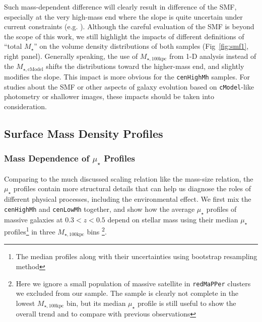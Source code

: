 \documentclass[a4paper,fleqn,usenatbib]{mnras}
\def\redm{\texttt{redMaPPer}}
\def\cmodel{\texttt{cModel}}
\def\rbcg{\texttt{cenHighMh}}
\def\nbcg{\texttt{cenLowMh}}
\def\mstar{{$M_{\star}$}}
\def\mtot{{$M_{\star,100\mathrm{kpc}}$}}
\def\mcmodel{{$M_{\star,\mathrm{cModel}}$}}
\def\mden{{$\mu_{\star}$}}
\begin{document}
    Such mass-dependent difference will clearly result in difference of the SMF, 
    especially at the very high-mass end where the slope is quite uncertain under
    current constraints (e.g. \citealt{Bernardi2016}).
    Although the careful evaluation of the SMF is beyond the scope of this work, 
    we still highlight the impacts of different definitions of ``total \mstar{}''
    on the volume density distributions of both samples (Fig~\ref{fig:smf1}, 
    right panel).  
    Generally speaking, the use of \mtot{} from 1-D analysis instead of the
    \mcmodel{} shifts the distributions toward the higher-mass end, and slightly 
    modifies the slope.
    This impact is more obvious for the \rbcg{} samples.
    For studies about the SMF or other aspects of galaxy evolution based on 
    \cmodel{}-like photometry or shallower images, these impacts should be 
    taken into consideration.


\subsection{Surface Mass Density Profiles}
    \label{ssec:sbp_compare}

\subsubsection{Mass Dependence of \mden{} Profiles}
    \label{sssec:sbp_inter}
          
    Comparing to the much discussed scaling relation like the mass-size relation, 
    the \mden{} profiles contain more structural details that can help us diagnose the 
    roles of different physical processes, including the environmental effect.  
    We first mix the \rbcg{} and \nbcg{} together, and show how the average \mden{}
    profiles of massive galaxies at $0.3 < z < 0.5$ depend on stellar mass using their 
    median \mden{} profiles\footnote{The median profiles along with their uncertainties 
    using bootstrap resampling method} in three \mtot{} bins \footnote{Here we ignore a 
    small population of massive satellite in \redm{} clusters we excluded from our 
    sample.
    The sample is clearly not complete in the lowest \mtot{} bin, but its median \mden{}
    profile is still useful to show the overall trend and to compare with previous 
    observations}.
\end{document}
